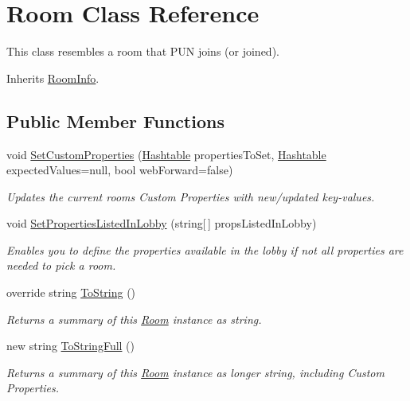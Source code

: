 \hypertarget{class_room}{}\section{Room Class Reference}
\label{class_room}


This class resembles a room that P\+UN joins (or joined).  




Inherits \hyperlink{class_room_info}{Room\+Info}.

\subsection*{Public Member Functions}
\begin{DoxyCompactItemize}
\item 
void \hyperlink{class_room_a9f8ac164f4f24be4140221b72792250a}{Set\+Custom\+Properties} (\hyperlink{_extensions_8cs_afa613ef589c02dbd94acc273b62cdcfd}{Hashtable} properties\+To\+Set, \hyperlink{_extensions_8cs_afa613ef589c02dbd94acc273b62cdcfd}{Hashtable} expected\+Values=null, bool web\+Forward=false)
\begin{DoxyCompactList}\small\item\em Updates the current room\textquotesingle{}s Custom Properties with new/updated key-\/values. \end{DoxyCompactList}\item 
void \hyperlink{class_room_af3c714b645bb569f4b7f060a985dbf1a}{Set\+Properties\+Listed\+In\+Lobby} (string\mbox{[}$\,$\mbox{]} props\+Listed\+In\+Lobby)
\begin{DoxyCompactList}\small\item\em Enables you to define the properties available in the lobby if not all properties are needed to pick a room. \end{DoxyCompactList}\item 
override string \hyperlink{class_room_ac193e5eddc588b1642b4de892d71082f}{To\+String} ()
\begin{DoxyCompactList}\small\item\em Returns a summary of this \hyperlink{class_room}{Room} instance as string. \end{DoxyCompactList}\item 
new string \hyperlink{class_room_a6f07e076b19abab3c30d2d7ce484538e}{To\+String\+Full} ()
\begin{DoxyCompactList}\small\item\em Returns a summary of this \hyperlink{class_room}{Room} instance as longer string, including Custom Properties. \end{DoxyCompactList}\end{DoxyCompactItemize}
